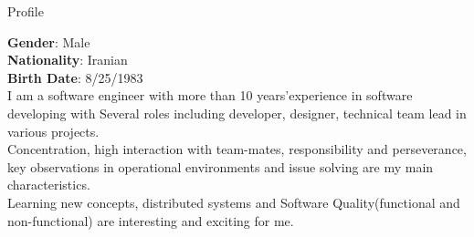 
\begin{jrsection}[location = sidebar]{Profile}
    \begin{jrdescription}
        {\bfseries Gender}: Male \\
        {\bfseries Nationality}: Iranian \\
        {\bfseries Birth Date}: 8/25/1983 \\
    I am a software engineer with more than 10 years\rq experience in software developing with Several roles
    including developer, designer, technical team lead in various projects.\\
    Concentration, high interaction with team-mates, responsibility and perseverance,
    key observations in operational environments and issue solving are my main characteristics.\\
    Learning new concepts, distributed systems and Software Quality(functional and non-functional)
    are interesting and exciting for me.
    \end{jrdescription}
\end{jrsection}
